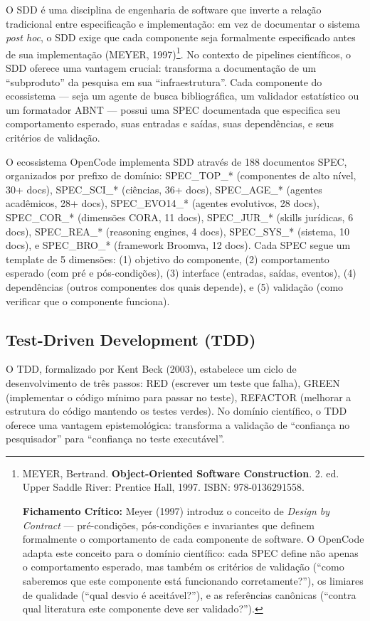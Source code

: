 O SDD é uma disciplina de engenharia de software que inverte a relação tradicional entre especificação e implementação: em vez de documentar o sistema \textit{post hoc}, o SDD exige que cada componente seja formalmente especificado antes de sua implementação (MEYER, 1997)\footnote{
  MEYER, Bertrand. \textbf{Object-Oriented Software Construction}. 2. ed. Upper Saddle River: Prentice Hall, 1997. ISBN: 978-0136291558.

  \textbf{Fichamento Crítico:} Meyer (1997) introduz o conceito de \textit{Design by Contract} --- pré-condições, pós-condições e invariantes que definem formalmente o comportamento de cada componente de software. O OpenCode adapta este conceito para o domínio científico: cada SPEC define não apenas o comportamento esperado, mas também os critérios de validação (``como saberemos que este componente está funcionando corretamente?''), os limiares de qualidade (``qual desvio é aceitável?''), e as referências canônicas (``contra qual literatura este componente deve ser validado?'').
}. No contexto de pipelines científicos, o SDD oferece uma vantagem crucial: transforma a documentação de um ``subproduto'' da pesquisa em sua ``infraestrutura''. Cada componente do ecossistema --- seja um agente de busca bibliográfica, um validador estatístico ou um formatador ABNT --- possui uma SPEC documentada que especifica seu comportamento esperado, suas entradas e saídas, suas dependências, e seus critérios de validação.

O ecossistema OpenCode implementa SDD através de 188 documentos SPEC, organizados por prefixo de domínio: SPEC\_TOP\_* (componentes de alto nível, 30+ docs), SPEC\_SCI\_* (ciências, 36+ docs), SPEC\_AGE\_* (agentes acadêmicos, 28+ docs), SPEC\_EVO14\_* (agentes evolutivos, 28 docs), SPEC\_COR\_* (dimensões CORA, 11 docs), SPEC\_JUR\_* (skills jurídicas, 6 docs), SPEC\_REA\_* (reasoning engines, 4 docs), SPEC\_SYS\_* (sistema, 10 docs), e SPEC\_BRO\_* (framework Broomva, 12 docs). Cada SPEC segue um template de 5 dimensões: (1) objetivo do componente, (2) comportamento esperado (com pré e pós-condições), (3) interface (entradas, saídas, eventos), (4) dependências (outros componentes dos quais depende), e (5) validação (como verificar que o componente funciona).

\subsection{Test-Driven Development (TDD)}

O TDD, formalizado por Kent Beck (2003), estabelece um ciclo de desenvolvimento de três passos: RED (escrever um teste que falha), GREEN (implementar o código mínimo para passar no teste), REFACTOR (melhorar a estrutura do código mantendo os testes verdes). No domínio científico, o TDD oferece uma vantagem epistemológica: transforma a validação de ``confiança no pesquisador'' para ``confiança no teste executável''.

